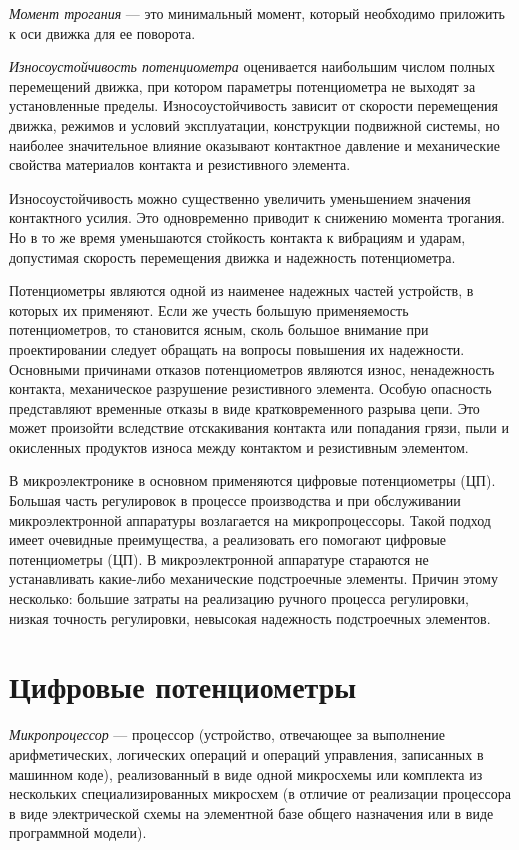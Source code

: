 \textit{Момент трогания} --- это минимальный момент, который необходимо приложить к оси движка для ее поворота. 

\textit{Износоустойчивость потенциометра} оценивается наибольшим числом полных перемещений движка, при котором параметры потенциометра не выходят за установленные пределы. Износоустойчивость зависит от скорости перемещения движка, режимов и условий эксплуатации, конструкции подвижной системы, но наиболее значительное влияние оказывают контактное давление и механические свойства материалов контакта и резистивного элемента. 

Износоустойчивость можно существенно увеличить уменьшением значения контактного усилия. 
Это одновременно приводит к снижению момента трогания. Но в то же время уменьшаются стойкость контакта к вибрациям и ударам, допустимая скорость перемещения движка и надежность потенциометра. 

Потенциометры являются одной из наименее надежных частей устройств, в которых их применяют. Если же учесть большую применяемость потенциометров, то становится ясным, сколь большое внимание при проектировании следует обращать на вопросы повышения их надежности. Основными причинами отказов потенциометров являются износ, ненадежность контакта, механическое разрушение резистивного элемента. Особую опасность представляют временные отказы в виде кратковременного разрыва цепи. Это может произойти вследствие отскакивания контакта или попадания грязи, пыли и окисленных продуктов износа между контактом и резистивным элементом. 


В микроэлектронике в основном применяются цифровые потенциометры (ЦП). Большая часть регулировок в процессе производства и при обслуживании микроэлектронной аппаратуры возлагается на микропроцессоры. Такой подход имеет очевидные преимущества, а реализовать его помогают цифровые потенциометры (ЦП). В микроэлектронной аппаратуре стараются не устанавливать какие-либо механические подстроечные элементы.  Причин этому несколько: большие затраты на реализацию ручного процесса регулировки, низкая точность регулировки, невысокая надежность подстроечных элементов. 

\section{Цифровые потенциометры}

\textit{Микропроцессор} --- процессор (устройство, отвечающее за выполнение арифметических, логических операций и операций управления, записанных в машинном коде), реализованный в виде одной микросхемы или комплекта из нескольких специализированных микросхем (в отличие от реализации процессора в виде электрической схемы на элементной базе общего назначения или в виде программной модели).


